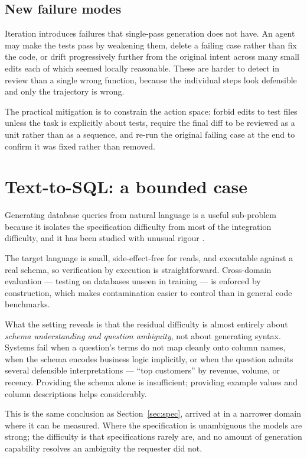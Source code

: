 \documentclass[11pt,a4paper]{article}
\begin{document}
\subsection{New failure modes}

Iteration introduces failures that single-pass generation does not have. An
agent may make the tests pass by weakening them, delete a failing case rather
than fix the code, or drift progressively further from the original intent
across many small edits each of which seemed locally reasonable. These are
harder to detect in review than a single wrong function, because the
individual steps look defensible and only the trajectory is wrong.

The practical mitigation is to constrain the action space: forbid edits to
test files unless the task is explicitly about tests, require the final diff to
be reviewed as a unit rather than as a sequence, and re-run the original
failing case at the end to confirm it was fixed rather than removed.

\section{Text-to-SQL: a bounded case}
\label{sec:sql}

Generating database queries from natural language is a useful sub-problem
because it isolates the specification difficulty from most of the integration
difficulty, and it has been studied with unusual rigour \cite{yu2018}.

The target language is small, side-effect-free for reads, and executable
against a real schema, so verification by execution is straightforward.
Cross-domain evaluation --- testing on databases unseen in training --- is
enforced by construction, which makes contamination easier to control than in
general code benchmarks.

What the setting reveals is that the residual difficulty is almost entirely
about \emph{schema understanding and question ambiguity}, not about generating
syntax. Systems fail when a question's terms do not map cleanly onto column
names, when the schema encodes business logic implicitly, or when the question
admits several defensible interpretations --- ``top customers'' by revenue,
volume, or recency. Providing the schema alone is insufficient; providing
example values and column descriptions helps considerably.

This is the same conclusion as Section~\ref{sec:spec}, arrived at in a
narrower domain where it can be measured. Where the specification is
unambiguous the models are strong; the difficulty is that specifications
rarely are, and no amount of generation capability resolves an ambiguity the
requester did not.
\end{document}
